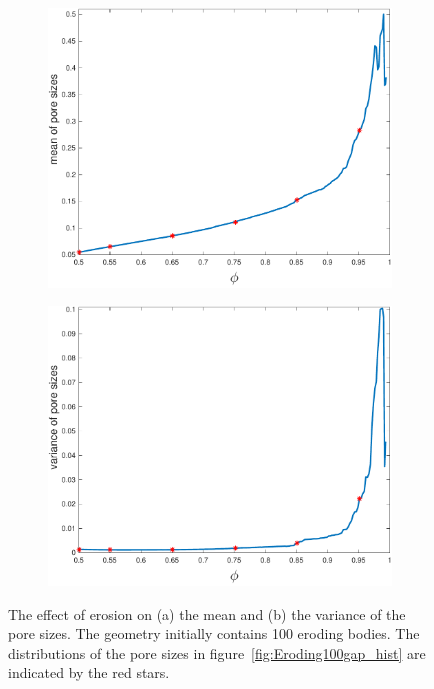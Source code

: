 \documentclass{jfm}
\begin{document}
\begin{figure}
\begin{subfigure}[b]{0.5\textwidth}
\includegraphics*[height = 0.8\linewidth]{./figs/gap_mean}
\caption{}
\end{subfigure}
\begin{subfigure}[b]{0.5\textwidth}
\includegraphics*[height=0.8\linewidth]{./figs/gap_variance}
\caption{}
\end{subfigure}
\caption{\label{fig:Eroding100gap_mean_var} The effect of erosion on (a)
the mean and (b) the variance of the pore sizes. The geometry initially
contains 100 eroding bodies. The distributions of the pore sizes in
figure~\ref{fig:Eroding100gap_hist} are indicated by the red stars.}
\end{figure}
\end{document}
